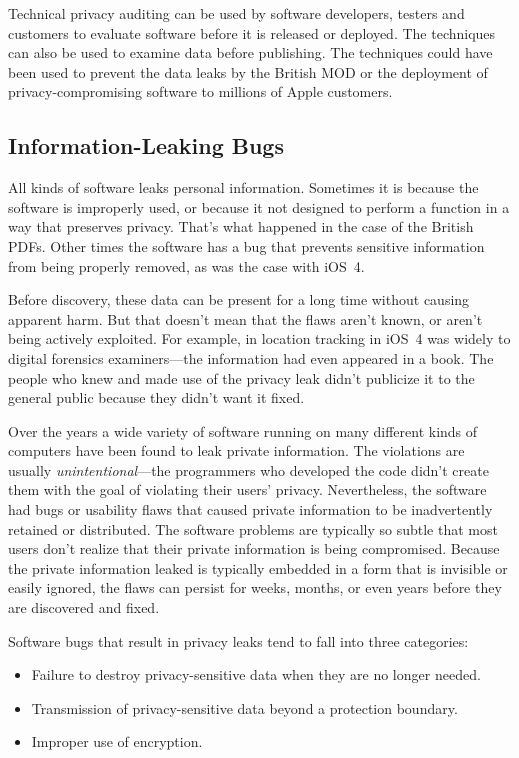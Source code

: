Technical privacy auditing can be used by software developers, testers
and customers to evaluate software before it is released or
deployed. The techniques can also be used to examine data before
publishing. The techniques could have been used to prevent the data
leaks by the British MOD or the deployment of privacy-compromising
software to millions of Apple customers.

\subsection{Information-Leaking Bugs \DONE}

All kinds of software leaks personal information. Sometimes it is
because the software is improperly used, or because it not designed
to perform a function in a way that preserves privacy. That's what
happened in the case of the British PDFs. Other times the software has
a bug that prevents sensitive information from being properly
removed, as was the case with iOS~4.

Before discovery, these data can be present for a long time without
causing apparent harm. But that doesn't mean that the flaws aren't
known, or aren't being actively exploited. For example, in location
tracking in iOS~4 was widely to digital forensics examiners---the
information had even appeared in a book. The people who knew and made
use of the privacy leak didn't publicize it to the general public
because they didn't want it fixed.  

Over the years a wide variety of software running on many different
kinds of computers have been found to leak private information.  The
violations are usually  
\emph{unintentional}---the programmers who developed the code didn't
create them with the goal of violating their users'
privacy. Nevertheless, the software 
had bugs or usability flaws that caused private information to be
inadvertently retained or distributed. The software problems are
typically so subtle that most users don't realize that their private
information is being compromised. Because the private information
leaked is typically embedded in a form that is invisible or easily
ignored, the flaws can persist for weeks, months, or even years before
they are discovered and fixed.

Software bugs that result in privacy leaks tend to fall into three
categories:

\begin{itemize}
\item Failure to destroy privacy-sensitive data when they are no longer needed.
\item Transmission of privacy-sensitive data beyond a protection boundary. 
\item Improper use of encryption.
\end{itemize}

